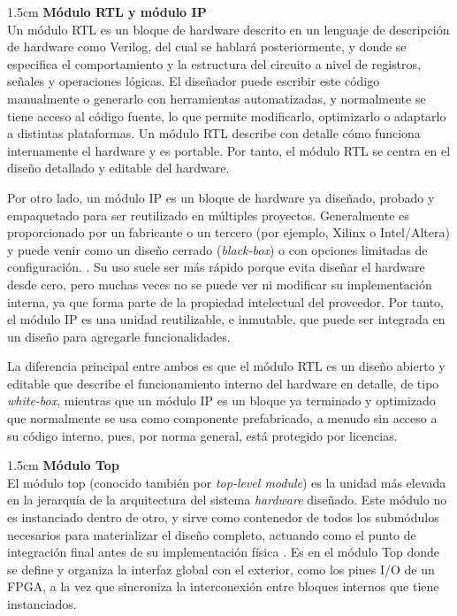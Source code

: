 \vspace{0.4em} %

\begin{adjustwidth}{1.5cm}{}
\textbf{Módulo RTL y módulo IP} \vspace{0.25cm} \\
Un módulo \ac{RTL} es un bloque de hardware descrito en un lenguaje de descripción de hardware como Verilog, del cual se hablará posteriormente, y donde se especifica el comportamiento y la estructura del circuito a nivel de registros, señales y operaciones lógicas. El diseñador puede escribir este código manualmente o generarlo con herramientas automatizadas, y normalmente se tiene acceso al código fuente, lo que permite modificarlo, optimizarlo o adaptarlo a distintas plataformas. Un módulo RTL describe con detalle cómo funciona internamente el hardware y es portable. Por tanto, el módulo RTL se centra en el diseño detallado y editable del hardware. \cite{moduloRTL}

Por otro lado, un módulo \ac{IP} es un bloque de hardware ya diseñado, probado y empaquetado para ser reutilizado en múltiples proyectos. Generalmente es proporcionado por un fabricante o un tercero (por ejemplo, Xilinx o Intel/Altera) y puede venir como un diseño cerrado (\textit{black-box}) o con opciones limitadas de configuración. \cite{moduloIP}. Su uso suele ser más rápido porque evita diseñar el hardware desde cero, pero muchas veces no se puede ver ni modificar su implementación interna, ya que forma parte de la propiedad intelectual del proveedor. Por tanto, el módulo IP es una unidad reutilizable, e inmutable, que puede ser integrada en un diseño para agregarle funcionalidades. 

La diferencia principal entre ambos es que el módulo RTL es un diseño abierto y editable que describe el funcionamiento interno del hardware en detalle, de tipo \textit{white-box}, mientras que un módulo IP es un bloque ya terminado y optimizado que normalmente se usa como componente prefabricado, a menudo sin acceso a su código interno, pues, por norma general, está protegido por licencias.
\end{adjustwidth}

\vspace{0.4em} %

\begin{adjustwidth}{1.5cm}{}
\label{st:topModule}
\textbf{Módulo Top} \vspace{0.25cm} \\
El módulo top (conocido también por \textit{top-level module}) es la unidad más elevada en la jerarquía de la arquitectura del sistema \textit{hardware} diseñado. Este módulo no es instanciado dentro de otro, y sirve como contenedor de todos los submódulos necesarios para materializar el diseño completo, actuando como el punto de integración final antes de su implementación física \cite{infoTop}. Es en el módulo Top donde se define y organiza la interfaz global con el exterior, como los pines I/O de un FPGA, a la vez que sincroniza la interconexión entre bloques internos que tiene instanciados.
\end{adjustwidth}

